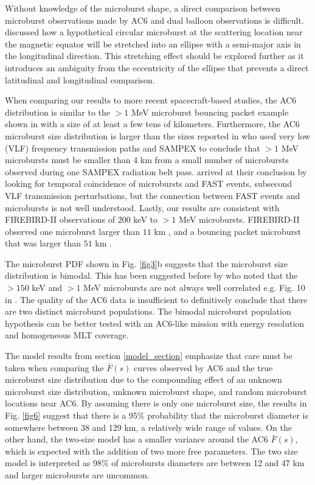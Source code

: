 \documentclass[draft]{agujournal2019}
\begin{document}
Without knowledge of the microburst shape, a direct comparison between microburst observations made by AC6 and dual balloon observations is difficult.  discussed how a hypothetical circular microburst at the scattering location near the magnetic equator will be stretched into an ellipse with a semi-major axis in the longitudinal direction. This stretching effect should be explored further as it introduces an ambiguity from the eccentricity of the ellipse that prevents a direct latitudinal and longitudinal comparison.

When comparing our results to more recent spacecraft-based studies, the AC6 distribution is similar to the $> 1$ MeV microburst bouncing packet example shown in  with a size of at least a few tens of kilometers. Furthermore, the AC6 microburst size distribution is larger than the sizes reported in  who used very low (VLF) frequency transmission paths and SAMPEX to conclude that $>1$ MeV microbursts must be smaller than 4 km from a small number of microbursts observed during one SAMPEX radiation belt pass.  arrived at their conclusion by looking for temporal coincidence of microbursts and FAST events, subsecond VLF transmission perturbations, but the connection between FAST events and microbursts is not well understood. Lastly, our results are consistent with FIREBIRD-II observations of $200$ keV to $>1$ MeV microbursts. FIREBIRD-II observed one microburst larger than $11$ km \cite{Crew2016}, and a bouncing packet microburst that was larger than $51$ km \cite{Shumko2018a}.

The microburst PDF shown in Fig. \ref{fig3}b suggests that the microburst size distribution is bimodal. This has been suggested before by  who noted that the $> 150$ keV and $> 1$ MeV microbursts are not always well correlated e.g. Fig. 10 in . The quality of the AC6 data is insufficient to definitively conclude that there are two distinct microburst populations. The bimodal microburst population hypothesis can be better tested with an AC6-like mission with energy resolution and homogeneous MLT coverage.

The model results from section \ref{model_section} emphasize that care must be taken when comparing the $\bar{F}(s)$ curves observed by AC6 and the true microburst size distribution due to the compounding effect of an unknown microburst size distribution, unknown microburst shape, and random microburst locations near AC6. By assuming there is only one microburst size, the results in Fig. \ref{fig6} suggest that there is a 95\% probability that the microburst diameter is somewhere between 38 and 129 km, a relatively wide range of values. On the other hand, the two-size model has a smaller variance around the AC6 $\bar{F}(s)$, which is expected with the addition of two more free parameters. The two size model is interpreted as 98\% of microbursts diameters are between 12 and 47 km and larger microbursts are uncommon. 
\end{document}
